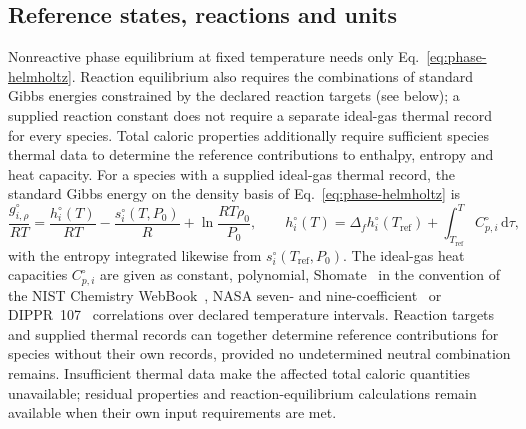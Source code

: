 \subsection{Reference states, reactions and units}
\label{sec:references}
Nonreactive phase equilibrium at fixed temperature needs only Eq.~\eqref{eq:phase-helmholtz}.
Reaction equilibrium also requires the combinations of standard Gibbs energies constrained by the declared reaction targets (see below); a supplied reaction constant does not require a separate ideal-gas thermal record for every species.
Total caloric properties additionally require sufficient species thermal data to determine the reference contributions to enthalpy, entropy and heat capacity.
For a species with a supplied ideal-gas thermal record, the standard Gibbs energy on the density basis of Eq.~\eqref{eq:phase-helmholtz} is
\begin{equation}
\frac{g^{\circ}_{i,\rho}}{RT}=\frac{h^{\circ}_i(T)}{RT}-\frac{s^{\circ}_i(T,P_0)}{R}+\ln\frac{RT\rho_0}{P_0},\qquad
h^{\circ}_i(T)=\Delta_fh^{\circ}_i(T_{\mathrm{ref}})+\int_{T_{\mathrm{ref}}}^{T}C^{\circ}_{p,i}\,\mathrm{d}\tau,
\label{eq:reference}
\end{equation}
with the entropy integrated likewise from $s^{\circ}_i(T_{\mathrm{ref}},P_0)$.
The ideal-gas heat capacities $C^{\circ}_{p,i}$ are given as constant, polynomial, Shomate~\citep{shomateMethodEvaluatingCorrelating1954} in the convention of the NIST Chemistry WebBook~\citep{linstromNISTChemistryWebBook1997}, NASA seven- and nine-coefficient~\citep{gordonComputerProgramCalculation1994} or DIPPR~107~\citep{alySelfconsistentEquationsCalculating1981} correlations over declared temperature intervals.
Reaction targets and supplied thermal records can together determine reference contributions for species without their own records, provided no undetermined neutral combination remains.
Insufficient thermal data make the affected total caloric quantities unavailable; residual properties and reaction-equilibrium calculations remain available when their own input requirements are met.

